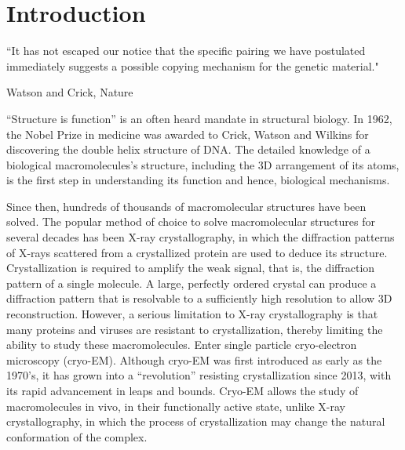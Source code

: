 \chapter{Introduction}
\epigraph{``It has not escaped our notice that the specific pairing we have postulated immediately suggests a possible copying mechanism for the genetic material."}{Watson and Crick, Nature \cite{watson1953}}

``Structure is function'' is an often heard mandate in structural biology. In 1962, the Nobel Prize in medicine was awarded to Crick, Watson and Wilkins for discovering the double helix structure of DNA. The detailed knowledge of a biological macromolecules's structure, including the 3D arrangement of its atoms, is the first step in understanding its function and hence, biological mechanisms.

Since then, hundreds of thousands of macromolecular structures have been solved. The popular method of choice to solve macromolecular structures for several decades has been X-ray crystallography, in which the diffraction patterns of X-rays scattered from a crystallized protein are used to deduce its structure. Crystallization is required to amplify the weak signal, that is, the diffraction pattern of a single molecule. A large, perfectly ordered crystal can produce a diffraction pattern that is resolvable to a sufficiently high resolution to allow 3D reconstruction. However, a serious limitation to X-ray crystallography is that many proteins and viruses are resistant to crystallization, thereby limiting the ability to study these macromolecules. Enter single particle cryo-electron microscopy (cryo-EM). Although cryo-EM was first introduced as early as the 1970's, it has grown into a ``revolution'' resisting crystallization \cite{Kuhlbrandt1443} since 2013, with its rapid advancement in leaps and bounds. Cryo-EM allows the study of macromolecules in vivo, in their functionally active state, unlike X-ray crystallography, in which the process of crystallization may change the natural conformation of the complex.


